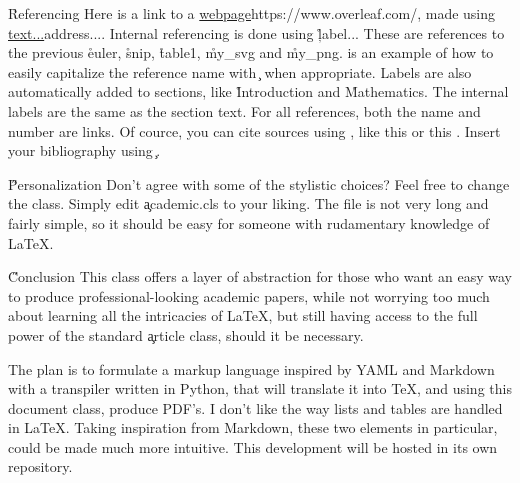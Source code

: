 \documentclass[onecolumn]{paper}
\begin{document}

\h{Referencing}
Here is a link to a \url{webpage}{https://www.overleaf.com/}, made using \c{\url{text...}{address...}}. Internal referencing is done using \c{\r{label...}} These are references to the previous \r{euler}, \r{snip}, \r{table1}, \r{my_svg} and \r{my_png}.  is an example of how to easily capitalize the reference name with \c{} when appropriate. Labels are also automatically added to sections, like \r{Introduction} and \r{Mathematics}. The internal labels are the same as the section text. For all references, both the name and number are links. Of cource, you can cite sources using \c{\cite{...}}, like this \cite{minted} or this \cite{tabularray}. Insert your bibliography using \c{}.

\H{Personalization}
Don't agree with some of the stylistic choices? Feel free to change the class. Simply edit \c{academic.cls} to your liking. The file is not very long and fairly simple, so it should be easy for someone with rudamentary knowledge of LaTeX.

\H{Conclusion}
This class offers a layer of abstraction for those who want an easy way to produce professional-looking academic papers, while not worrying too much about learning all the intricacies of LaTeX, but still having access to the full power of the standard \c{article} class, should it be necessary.

The plan is to formulate a markup language inspired by YAML and Markdown with a transpiler written in Python, that will translate it into TeX, and using this document class, produce PDF's. I don't like the way lists and tables are handled in LaTeX. Taking inspiration from Markdown, these two elements in particular, could be made much more intuitive. This development will be hosted in its own repository.
\end{document}
